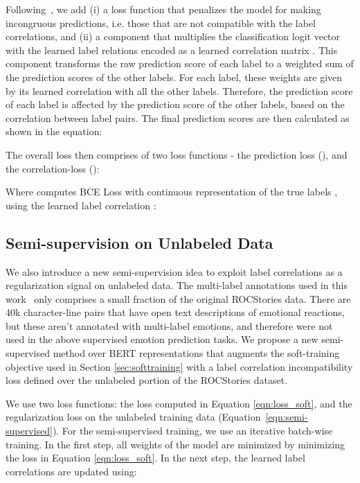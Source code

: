 \documentclass[11pt,a4paper]{article}
\begin{document}
Following~\citet{zhao-etal-2019-review}, we add (i) a loss function that penalizes the model for making incongruous predictions, i.e. those that are not compatible with the label correlations, and (ii) a component that multiplies the classification logit vector  with the learned label relations encoded as a learned correlation matrix . This component transforms the raw prediction score of each label to a weighted sum of the prediction scores of the other labels. For each label, these weights are given by its learned correlation with all the other labels. Therefore, the prediction score of each label is affected by the prediction score of the other labels, based on the correlation between label pairs. The final prediction scores are then calculated as shown in the equation:   


The overall loss then comprises of two loss functions - the prediction loss (), and the correlation-loss (): 


Where  computes BCE Loss with continuous representation of the true labels , using the learned label correlation :


\subsection{Semi-supervision on Unlabeled Data}
We also introduce a new semi-supervision idea to exploit label correlations as a regularization signal on unlabeled data. The multi-label annotations used in this work~\cite{rashkin2018modeling} only comprises a small fraction of the original ROCStories data. There are 40k character-line pairs that have open text descriptions of emotional reactions, but these aren't annotated with multi-label emotions, and therefore were not used in the above supervised emotion prediction tasks. 
We propose a new semi-supervised method over BERT representations that augments the soft-training objective used in Section \ref{sec:softtraining} with a label correlation incompatibility loss defined over the unlabeled portion of the ROCStories dataset. 

We use two loss functions: the loss computed in Equation \ref{eqn:loss_soft}, and the regularization loss on the unlabeled training data (Equation~\ref{eqn:semi-supervised}).
For the semi-supervised training, we use an iterative batch-wise training. In the first step, all weights of the model are minimized by minimizing the loss in Equation \ref{eqn:loss_soft}. In the next step, the learned label correlations are updated using:
\end{document}
